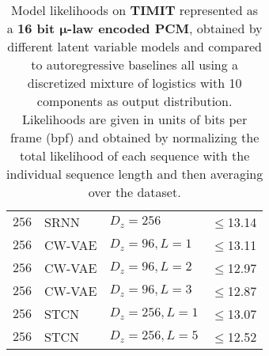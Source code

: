 \begin{table}[p]
\begin{tabular}{lll|r}
        $256$     & SRNN                & $D_z=256$             & $\leq$13.14 \\
        $256$     & CW-VAE              & $D_z=96, L=1$         & $\leq$13.11 \\
        $256$     & CW-VAE              & $D_z=96, L=2$         & $\leq$12.97 \\
        $256$     & CW-VAE              & $D_z=96, L=3$         & $\leq$12.87 \\
        $256$ & STCN              & $D_z=256,L=1$               & $\leq$13.07 \\  %
        $256$ & STCN              & $D_z=256,L=5$               & $\leq$12.52 \\
        \bottomrule
    \end{tabular}
    \caption{
    Model likelihoods on \textbf{TIMIT} represented as a \textbf{16 bit $\boldsymbol{\mu}$-law encoded PCM}, obtained by different latent variable models and compared to autoregressive baselines all using a discretized mixture of logistics with 10 components as output distribution. Likelihoods are given in units of bits per frame (bpf) and obtained by normalizing the total likelihood of each sequence with the individual sequence length and then averaging over the dataset.
    }
    \label{tab: timit likelihoods dmol mu-law appendix}
\end{table}


